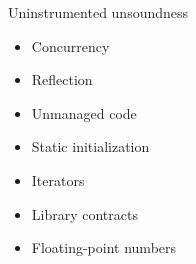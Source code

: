 \begin{frame}{Uninstrumented unsoundness}

\begin{itemize}
  \item Concurrency

  \vspace*{0.2cm}

  \item Reflection

  \vspace*{0.2cm}

  \item Unmanaged code

  \vspace*{0.2cm}

  \item Static initialization

  \vspace*{0.2cm}

  \item Iterators

  \vspace*{0.2cm}

  \item Library contracts

  \vspace*{0.2cm}

  \item Floating-point numbers
\end{itemize}

\end{frame}
